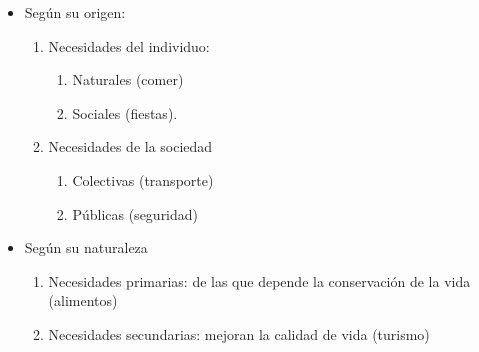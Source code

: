 \begin{itemize}
    \item Según su origen:
    \begin{enumerate}
        \item Necesidades del individuo: 
        \begin{enumerate}
            \item Naturales (comer)
            \item Sociales (fiestas).
        \end{enumerate}
        \item Necesidades de la sociedad 
        \begin{enumerate}
            \item Colectivas (transporte) 
            \item Públicas (seguridad)
        \end{enumerate}
    \end{enumerate}
    \item Según su naturaleza 
    \begin{enumerate}
        \item Necesidades primarias: de las que depende la conservación de la vida (alimentos)
        \item Necesidades secundarias: mejoran la calidad de vida (turismo)
    \end{enumerate}
\end{itemize}
